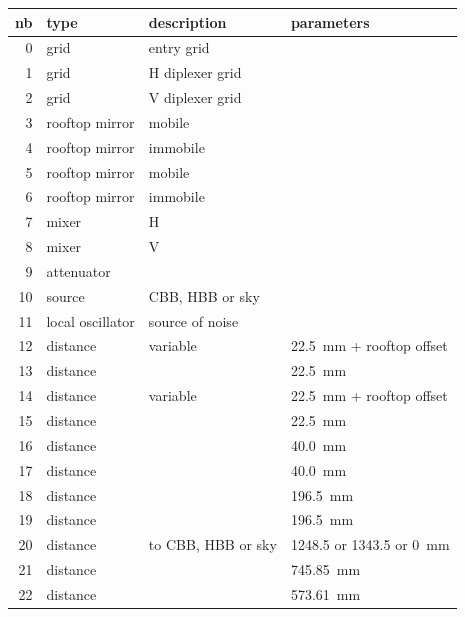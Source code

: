 \begin{table}
    \begin{tabular}{rlll}
        \toprule
        nb & type & description & parameters \\
        \midrule
         0 & grid             & entry grid                      & \\
         1 & grid             & H diplexer grid                 & \\
         2 & grid             & V diplexer grid                 & \\
         3 & rooftop mirror   & mobile                          & \\
         4 & rooftop mirror   & immobile                        & \\
         5 & rooftop mirror   & mobile                          & \\
         6 & rooftop mirror   & immobile                        & \\
         7 & mixer            & H                               & \\
         8 & mixer            & V                               & \\
         9 & attenuator       &                                 & \\
        10 & source           & CBB, HBB or sky  & \\
        11 & local oscillator & source of noise                 & \\
        12 & distance         & variable       & \SI{22.5}{\milli\meter} + rooftop offset  \\
        13 & distance         &                                 & \SI{22.5}{\milli\meter}           \\
        14 & distance         & variable       & \SI{22.5}{\milli\meter} + rooftop offset  \\
        15 & distance         &                                 & \SI{22.5}{\milli\meter}           \\
        16 & distance         &                                 & \SI{40.0}{\milli\meter}           \\
        17 & distance         &                                 & \SI{40.0}{\milli\meter}           \\
        18 & distance         &                                 & \SI{196.5}{\milli\meter}          \\
        19 & distance         &                                 & \SI{196.5}{\milli\meter}          \\
        20 & distance         & to CBB, HBB or sky              & 1248.5 or 1343.5 or \SI{0}{\milli\meter} \\
        21 & distance         &                                 & \SI{745.85}{\milli\meter} \\
        22 & distance         &                                 & \SI{573.61}{\milli\meter} \\
        \bottomrule
    \end{tabular}
\end{table}

